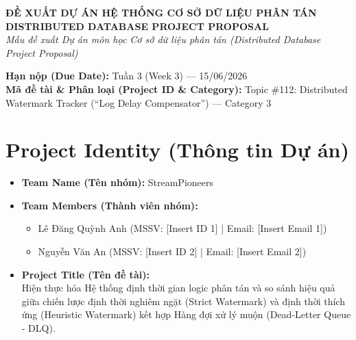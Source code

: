 \documentclass[12pt,a4paper]{article}
\begin{document}

\begin{center}
    \large\textbf{ĐỀ XUẤT DỰ ÁN HỆ THỐNG CƠ SỞ DỮ LIỆU PHÂN TÁN} \\[6pt]
    \Large\textbf{DISTRIBUTED DATABASE PROJECT PROPOSAL} \\[10pt]
    \small\textit{Mẫu đề xuất Dự án môn học Cơ sở dữ liệu phân tán (Distributed Database Project Proposal)}
\end{center}

\vspace{1cm}

\noindent\textbf{Hạn nộp (Due Date):} Tuần 3 (Week 3) --- 15/06/2026 \\
\noindent\textbf{Mã đề tài \& Phân loại (Project ID \& Category):} Topic \#112: Distributed Watermark Tracker (``Log Delay Compensator'') --- Category 3

\vspace{0.8cm}

\section{Project Identity (Thông tin Dự án)}
\begin{itemize}[leftmargin=*]
    \item \textbf{Team Name (Tên nhóm):} StreamPioneers
    \item \textbf{Team Members (Thành viên nhóm):} 
    \begin{itemize}[label={-}]
        \item Lê Đăng Quỳnh Anh (MSSV: [Insert ID 1] | Email: [Insert Email 1])
        \item Nguyễn Văn An (MSSV: [Insert ID 2] | Email: [Insert Email 2])
    \end{itemize}
    \item \textbf{Project Title (Tên đề tài):} \\
    Hiện thực hóa Hệ thống định thời gian logic phân tán và so sánh hiệu quả giữa chiến lược định thời nghiêm ngặt (Strict Watermark) và định thời thích ứng (Heuristic Watermark) kết hợp Hàng đợi xử lý muộn (Dead-Letter Queue - DLQ).
\end{itemize}

\vspace{0.5cm}
\end{document}
